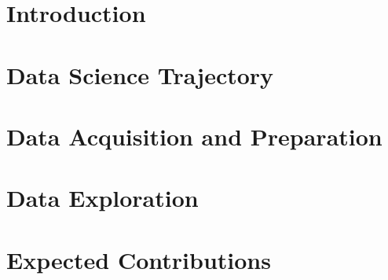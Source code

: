 \documentclass[sigplan,nonacm]{acmart}
\begin{document}
\title{}

\author{Brandon Hosley}


\begin{abstract}

\end{abstract}


\received{\today}

\maketitle

\section{Introduction}
\section{Data Science Trajectory}
\section{Data Acquisition and Preparation}
\section{Data Exploration}
\section{Expected Contributions}

\end{document}
